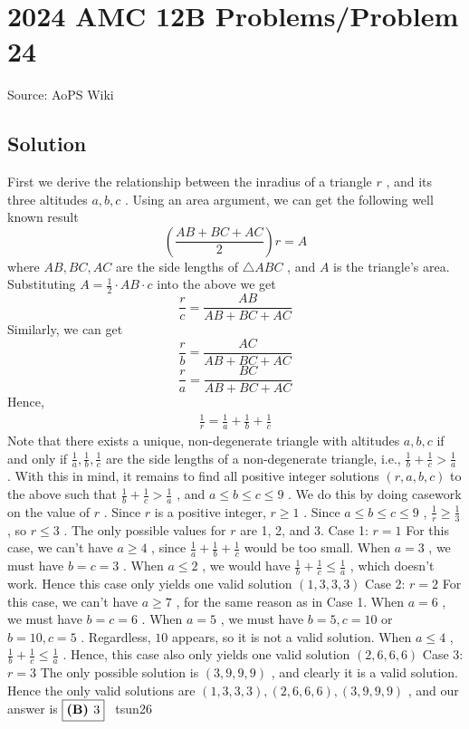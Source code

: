\documentclass[12pt]{article}
\begin{document}
\section*{{2024 AMC 12B Problems/Problem 24}}
Source: AoPS Wiki

\subsection*{Solution}
First we derive the relationship between the inradius of a triangle $r$ , and its three altitudes $a, b, c$ .
Using an area argument, we can get the following well known result \[\left(\frac{AB+BC+AC}{2}\right)r=A\] where $AB, BC, AC$ are the side lengths of $\triangle ABC$ , and $A$ is the triangle's area. Substituting $A=\frac{1}{2}\cdot AB\cdot c$ into the above we get \[\frac{r}{c}=\frac{AB}{AB+BC+AC}\] Similarly, we can get \[\frac{r}{b}=\frac{AC}{AB+BC+AC}\] \[\frac{r}{a}=\frac{BC}{AB+BC+AC}\] Hence,
\begin{align}\label{e1}
\frac{1}{r}=\frac{1}{a}+\frac{1}{b}+\frac{1}{c}
\end{align} Note that there exists a unique, non-degenerate triangle with altitudes $a, b, c$ if and only if $\frac{1}{a}, \frac{1}{b}, \frac{1}{c}$ are the side lengths of a non-degenerate triangle, i.e., $\frac{1}{b}+\frac{1}{c}>\frac{1}{a}$ . With this in mind, it remains to find all positive integer solutions $(r, a, b, c)$ to the above such that $\frac{1}{b}+\frac{1}{c}>\frac{1}{a}$ , and $a\le b\le c\le 9$ . We do this by doing casework on the value of $r$ . Since $r$ is a positive integer, $r\ge 1$ . Since $a\le b\le c\le 9$ , $\frac{1}{r}\ge \frac{1}{3}$ , so $r\le3$ . The only possible values for $r$ are 1, 2, and 3. Case 1: $r=1$ For this case, we can't have $a\ge 4$ , since $\frac{1}{a}+\frac{1}{b}+\frac{1}{c}$ would be too small. When $a=3$ , we must have $b=c=3$ . When $a\le2$ , we would have $\frac{1}{b}+\frac{1}{c}\le\frac{1}{a}$ , which doesn't work. Hence this case only yields one valid solution $(1, 3, 3, 3)$ Case 2: $r=2$ For this case, we can't have $a\ge 7$ , for the same reason as in Case 1. When $a=6$ , we must have $b=c=6$ . When $a=5$ , we must have $b=5, c=10$ or $b=10, c=5$ . Regardless, $10$ appears, so it is not a valid solution. When $a\le4$ , $\frac{1}{b}+\frac{1}{c}\le\frac{1}{a}$ . Hence, this case also only yields one valid solution $(2, 6, 6, 6)$ Case 3: $r=3$ The only possible solution is $(3, 9, 9, 9)$ , and clearly it is a valid solution. Hence the only valid solutions are $(1, 3, 3, 3), (2, 6, 6, 6), (3, 9, 9, 9)$ , and our answer is $\fbox{\textbf{(B) }3}$ ~tsun26
\end{document}

